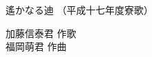 \documentclass[10pt,b5j]{tarticle} %
\begin{document}
\begin{minipage}[c]{0.7\hsize} %
    \begin{center}
        {\LARGE
            遙かなる迪 %
        }
        {\small 
            （平成十七年度寮歌） %
        }
    \end{center}
\end{minipage}
\begin{minipage}[c]{0.3\hsize} %
    \begin{flushright} %
        加藤信泰君 作歌\\福岡萌君 作曲 %
    \end{flushright}
\end{minipage}
\end{document}
